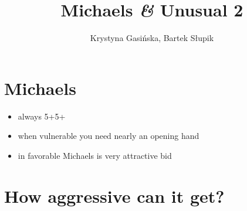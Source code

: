 \documentclass[12pt, a4paper]{article}
\title{Michaels \textit{\&} Unusual 2\nt}
\author{Krystyna Gasińska, Bartek Słupik}
\begin{document}
\maketitle

\section{Michaels}
\begin{itemize}
    \item always 5+5+
    \item when vulnerable you need nearly an opening hand
    \item in favorable Michaels is very attractive bid
\end{itemize}

\section{How aggressive can it get?}
\end{document}
